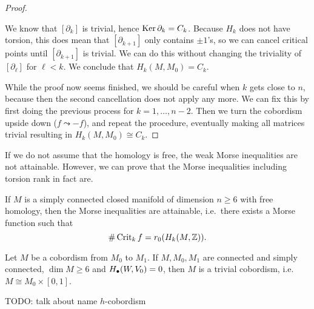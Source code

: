 \begin{proof}
\begin{enumerate}
            We know that $[\partial_k]$ is trivial, hence  $\operatorname{Ker} \partial_k = C_k$.
            Because $H_k$ does not have torsion, this does mean that $[\partial_{k+1}]$ only contains $\pm 1$'s, so we can cancel critical points until  $[\partial_{k+1}]$ is trivial. We can do this without changing the triviality of $[\partial_\ell]$ for $\ell < k$.
            We conclude that $H_k(M, M_0) = C_k$.
    \end{enumerate}
    While the proof now seems finished, we should be careful when $k$ gets close to  $n$, because then the second cancellation does not apply any more.
    We can fix this by first doing the previous process for $k = 1, \ldots, n-2$. 
    Then we turn the cobordism upside down ($f \leadsto -f$), and repeat the procedure, eventually making all matrices trivial resulting in $H_k(M, M_0) \cong C_k$.
\end{proof}
\begin{remark}
    If we do not assume that the homology is free, the weak Morse inequalities are not attainable.
    However, we can prove that the Morse inequalities including torsion rank in fact are.
\end{remark}
\begin{corollary}
    If $M$ is a simply connected closed manifold of dimension  $n \ge 6$ with free homology, then the Morse inequalities are attainable, i.e.\ there exists a Morse function such that
    \[
        \# \operatorname{Crit}_kf = r_0 (H_k(M, \mathbb{Z}))
    .\] 
\end{corollary}

\begin{corollary}
    Let $M$ be a cobordism from  $M_0$ to $M_1$.
    If $M, M_0, M_1$ are connected and simply connected, $\dim M \ge  6$ and $H_{\bullet}(W, V_0) = 0$, then $M$ is a trivial cobordism, i.e.  $M \cong M_0 \times [0,1]$.
\end{corollary}

TODO: talk about name $h$-cobordism

